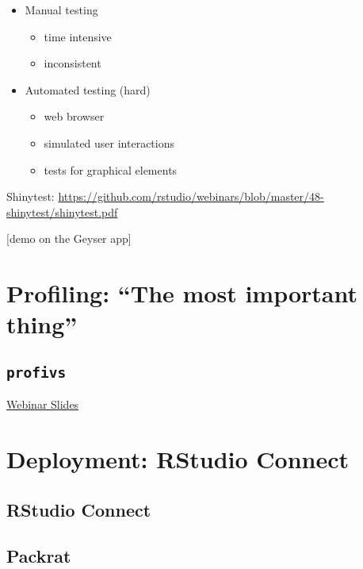 \documentclass[]{book}
\providecommand{\tightlist}{%
  \setlength{\itemsep}{0pt}\setlength{\parskip}{0pt}}
\begin{document}
\begin{itemize}
\tightlist
\item
  Manual testing

  \begin{itemize}
  \tightlist
  \item
    time intensive
  \item
    inconsistent
  \end{itemize}
\item
  Automated testing (hard)

  \begin{itemize}
  \tightlist
  \item
    web browser
  \item
    simulated user interactions
  \item
    tests for graphical elements
  \end{itemize}
\end{itemize}

Shinytest:
\url{https://github.com/rstudio/webinars/blob/master/48-shinytest/shinytest.pdf}

{[}demo on the Geyser app{]}

\hypertarget{profiling-the-most-important-thing}{%
\chapter{Profiling: ``The most important
thing''}\label{profiling-the-most-important-thing}}

\hypertarget{profivs}{%
\section{\texorpdfstring{\texttt{profivs}}{profivs}}\label{profivs}}

\href{https://github.com/rstudio/webinars/blob/master/26-Profiling/Profiling.pdf}{Webinar
Slides}

\hypertarget{deployment-rstudio-connect}{%
\chapter{Deployment: RStudio Connect}\label{deployment-rstudio-connect}}

\hypertarget{rstudio-connect}{%
\section{RStudio Connect}\label{rstudio-connect}}

\hypertarget{packrat}{%
\section{Packrat}\label{packrat}}
\end{document}
